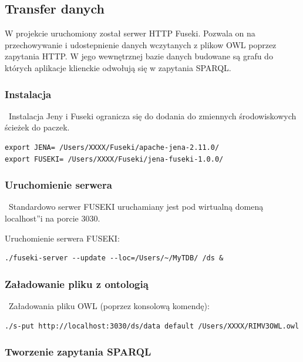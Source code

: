 \begin{multicols}{2}

\subsection{Transfer danych}
\label{sec:transfer}

W projekcie uruchomiony został serwer HTTP Fuseki. Pozwala on na przechowywanie i udostepnienie danych wczytanych z plikow OWL poprzez zapytania HTTP. W jego wewnętrznej bazie danych budowane są grafu do których aplikacje klienckie odwołują się w zapytania SPARQL.

\subsubsection{Instalacja}

~Instalacja Jeny i Fuseki ogranicza się do dodania do zmiennych środowiskowych ścieżek do paczek.
\begin{lstlisting}
export JENA= /Users/XXXX/Fuseki/apache-jena-2.11.0/
export FUSEKI= /Users/XXXX/Fuseki/jena-fuseki-1.0.0/
\end{lstlisting}

\subsubsection{Uruchomienie serwera}

~Standardowo serwer FUSEKI uruchamiany jest pod wirtualną domeną \quotedblbase localhost\textquotedblright i na porcie 3030.

Uruchomienie serwera FUSEKI:
\begin{lstlisting}
./fuseki-server --update --loc=/Users/~/MyTDB/ /ds &
\end{lstlisting}

\subsubsection{Załadowanie pliku z ontologią}

~Załadowania pliku OWL (poprzez konsolową komendę):

\begin{lstlisting}
./s-put http://localhost:3030/ds/data default /Users/XXXX/RIMV3OWL.owl
\end{lstlisting}

\subsubsection{Tworzenie zapytania SPARQL}


\end{multicols}
